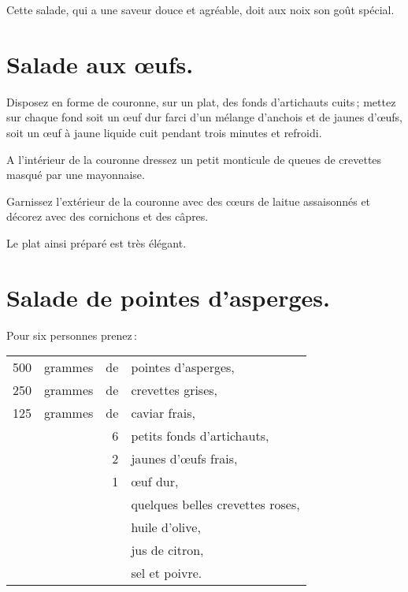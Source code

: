 Cette salade, qui a une saveur douce et agréable, doit aux noix son goût spécial.

\section*{\centering Salade aux œufs.}
{}

Disposez en forme de couronne, sur un plat, des fonds d’artichauts cuits ;
mettez sur chaque fond soit un œuf dur farci d'un mélange d'anchois et de
jaunes d'œufs, soit un œuf à jaune liquide cuit pendant trois minutes et
refroidi.

A l'intérieur de la couronne dressez un petit monticule de queues de crevettes
masqué par une mayonnaise.

Garnissez l'extérieur de la couronne avec des cœurs de laitue assaisonnés et
décorez avec des cornichons et des câpres.

Le plat ainsi préparé est très élégant.

\section*{\centering Salade de pointes d'asperges.}
{}

Pour six personnes prenez :

\footnotesize
\begin{longtable}{rrrp{16em}}
    500 & grammes & de & pointes d'asperges,                                                              \\
    250 & grammes & de & crevettes grises,                                                                \\
    125 & grammes & de & caviar frais,                                                                    \\
        &         &  6 & petits fonds d'artichauts,                                                       \\
        &         &  2 & jaunes d'œufs frais,                                                             \\
        &         &  1 & œuf dur,                                                                         \\
        &         &    & quelques belles crevettes roses,                                                 \\
        &         &    & huile d'olive,                                                                   \\
        &         &    & jus de citron,                                                                   \\
        &         &    & sel et poivre.                                                                   \\
\end{longtable}
\normalsize

